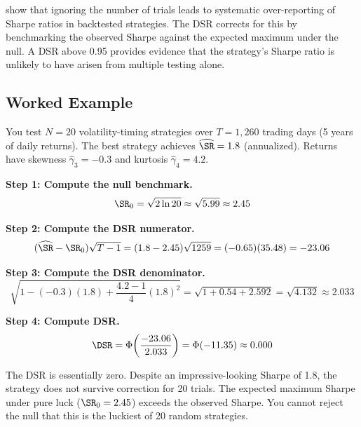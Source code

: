 \begin{keyresult}
\citet{Bailey2014DSR} show that ignoring the number of trials leads to systematic over-reporting of Sharpe ratios in backtested strategies.
The DSR corrects for this by benchmarking the observed Sharpe against the expected maximum under the null.
A DSR above 0.95 provides evidence that the strategy's Sharpe ratio is unlikely to have arisen from multiple testing alone.
\end{keyresult}

\subsection{Worked Example}

\begin{workedexample}
You test $N = 20$ volatility-timing strategies over $T = 1{,}260$ trading days (5 years of daily returns).
The best strategy achieves $\widehat{\SR} = 1.8$ (annualized).
Returns have skewness $\hat{\gamma}_3 = -0.3$ and kurtosis $\hat{\gamma}_4 = 4.2$.

\textbf{Step 1: Compute the null benchmark.}
\[
\SR_0 = \sqrt{2 \ln 20} \approx \sqrt{5.99} \approx 2.45
\]

\textbf{Step 2: Compute the DSR numerator.}
\[
(\widehat{\SR} - \SR_0)\sqrt{T - 1} = (1.8 - 2.45)\sqrt{1259} = (-0.65)(35.48) = -23.06
\]

\textbf{Step 3: Compute the DSR denominator.}
\[
\sqrt{1 - (-0.3)(1.8) + \frac{4.2 - 1}{4}(1.8)^2} = \sqrt{1 + 0.54 + 2.592} = \sqrt{4.132} \approx 2.033
\]

\textbf{Step 4: Compute DSR.}
\[
\DSR = \Phi\!\left(\frac{-23.06}{2.033}\right) = \Phi(-11.35) \approx 0.000
\]

The DSR is essentially zero.
Despite an impressive-looking Sharpe of 1.8, the strategy does not survive correction for 20 trials.
The expected maximum Sharpe under pure luck ($\SR_0 = 2.45$) exceeds the observed Sharpe.
You cannot reject the null that this is the luckiest of 20 random strategies.


\end{workedexample}
